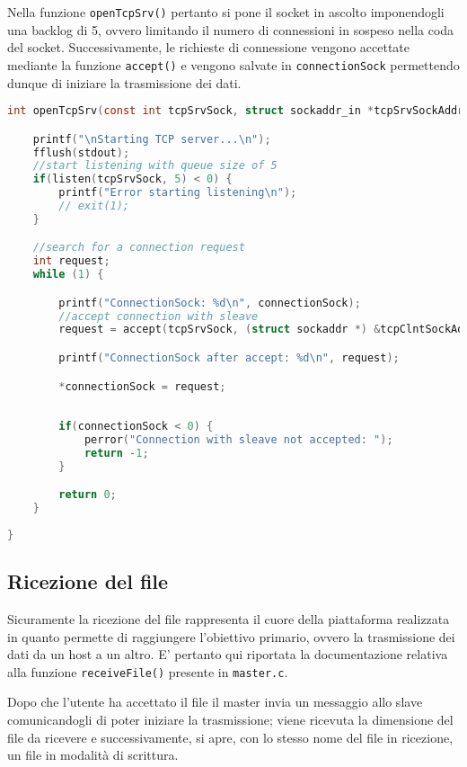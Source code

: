\documentclass[11pt,fleqn]{book} %
\begin{document}
Nella funzione \texttt{openTcpSrv()} pertanto si pone il socket in ascolto imponendogli una backlog di 5, ovvero limitando il numero di connessioni in sospeso nella coda del socket. Successivamente, le richieste di connessione vengono accettate mediante la funzione \texttt{accept()} e vengono salvate in \texttt{connectionSock} permettendo dunque di iniziare la trasmissione dei dati.
\begin{lstlisting}[language=C]
int openTcpSrv(const int tcpSrvSock, struct sockaddr_in *tcpSrvSockAddr, const int tcpSrvSockAddrLen, struct sockaddr_in *tcpClntSockAddr, int tcpClntSockAddrLen, int *connectionSock) {

	printf("\nStarting TCP server...\n");
	fflush(stdout);
	//start listening with queue size of 5
	if(listen(tcpSrvSock, 5) < 0) {
		printf("Error starting listening\n");
		// exit(1);
	}

	//search for a connection request
	int request;
	while (1) {

		printf("ConnectionSock: %d\n", connectionSock);
		//accept connection with sleave
		request = accept(tcpSrvSock, (struct sockaddr *) &tcpClntSockAddr, &tcpClntSockAddrLen);

		printf("ConnectionSock after accept: %d\n", request);

		*connectionSock = request;
		
		
		if(connectionSock < 0) {
			perror("Connection with sleave not accepted: ");
			return -1;
		}

		return 0;
	}
	
}
\end{lstlisting}

\subsection{Ricezione del file}
Sicuramente la ricezione del file rappresenta il cuore della piattaforma realizzata in quanto permette di raggiungere l'obiettivo primario, ovvero la trasmissione dei dati da un host a un altro. E' pertanto qui riportata la documentazione relativa alla funzione \texttt{receiveFile()} presente in \texttt{master.c}.

Dopo che l'utente ha accettato il file il master invia un messaggio allo slave comunicandogli di poter iniziare la trasmissione; viene ricevuta la dimensione del file da ricevere e successivamente, si apre, con lo stesso nome del file in ricezione, un file in modalità di scrittura.
\end{document}
